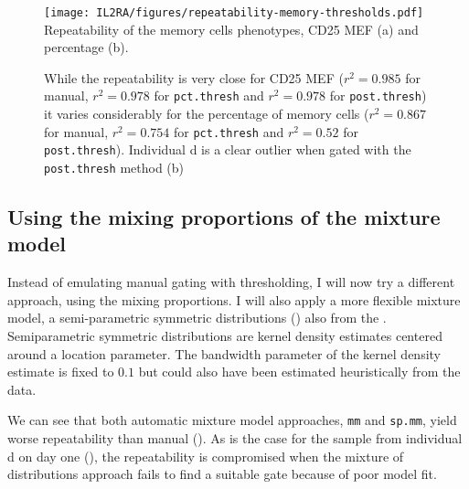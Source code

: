 \begin{figure}[h]
\centering
  \texttt{[image: IL2RA/figures/repeatability-memory-thresholds.pdf]}
{Repeatability of the memory cells phenotypes, CD25 MEF (a) and percentage (b).}
{
  While the repeatability is very close for CD25 MEF
  ($r^2=0.985$ for manual, $r^2=0.978$ for \texttt{pct.thresh} and $r^2=0.978$ for \texttt{post.thresh})
  it varies considerably for the percentage of memory cells
  ($r^2=0.867$ for manual, $r^2=0.754$ for \texttt{pct.thresh} and $r^2=0.52$ for \texttt{post.thresh}).
  Individual d is a clear outlier when gated with the \texttt{post.thresh} method (b)

}
\end{figure}


\subsection{Using the mixing proportions of the mixture model}

Instead of emulating manual gating with thresholding, I will now try a different approach, using the mixing proportions.
I will also apply a more flexible mixture model, a semi-parametric symmetric distributions () also from the .
Semiparametric symmetric distributions are kernel density estimates centered around a location parameter.
The bandwidth parameter of the kernel density estimate is fixed to $0.1$ but could also have been estimated heuristically from the data.

We can see that both automatic mixture model approaches, \texttt{mm} and \texttt{sp.mm}, yield worse repeatability than manual ().
As is the case for the sample from individual d on day one (),
the repeatability is compromised when the mixture of distributions approach fails to find a suitable gate because of poor model fit.

